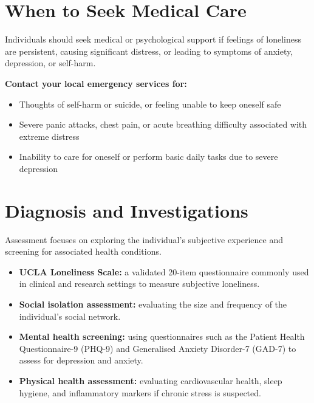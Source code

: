 \section*{When to Seek Medical Care}
Individuals should seek medical or psychological support if feelings of loneliness are persistent, causing significant distress, or leading to symptoms of anxiety, depression, or self-harm.

\textbf{Contact your local emergency services for:}
\begin{itemize}
    \item Thoughts of self-harm or suicide, or feeling unable to keep oneself safe
    \item Severe panic attacks, chest pain, or acute breathing difficulty associated with extreme distress
    \item Inability to care for oneself or perform basic daily tasks due to severe depression
\end{itemize}

\section*{Diagnosis and Investigations}
Assessment focuses on exploring the individual's subjective experience and screening for associated health conditions.
\begin{itemize}
    \item \textbf{UCLA Loneliness Scale:} a validated 20-item questionnaire commonly used in clinical and research settings to measure subjective loneliness.
    \item \textbf{Social isolation assessment:} evaluating the size and frequency of the individual's social network.
    \item \textbf{Mental health screening:} using questionnaires such as the Patient Health Questionnaire-9 (PHQ-9) and Generalised Anxiety Disorder-7 (GAD-7) to assess for depression and anxiety.
    \item \textbf{Physical health assessment:} evaluating cardiovascular health, sleep hygiene, and inflammatory markers if chronic stress is suspected.
\end{itemize}


